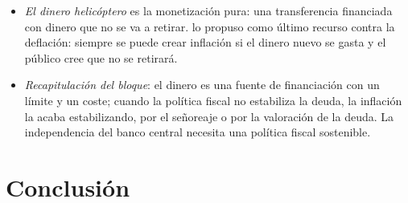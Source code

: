 \documentclass[11pt]{article}
\begin{document}
\begin{itemize}
\begin{enumerate}
  \item en economía abierta, la pérdida de confianza en la moneda trae depreciación y salida de capitales;
  \item frenar la inflación con impuestos es lento y políticamente difícil\nocite{Mankiw2020Skeptic}.
  \end{enumerate}
\item \emph{El dinero helicóptero} es la monetización pura: una transferencia financiada con dinero que no se va a retirar\nocite{Friedman1969Optimum}. \textcite{Bernanke2002Deflation} lo propuso como último recurso contra la deflación: siempre se puede crear inflación si el dinero nuevo se gasta y el público cree que no se retirará.
\item \emph{Recapitulación del bloque}: el dinero es una fuente de financiación con un límite y un coste; cuando la política fiscal no estabiliza la deuda, la inflación la acaba estabilizando, por el señoreaje o por la valoración de la deuda. La independencia del banco central necesita una política fiscal sostenible.
\end{itemize}

\section*{Conclusión}
\end{document}
